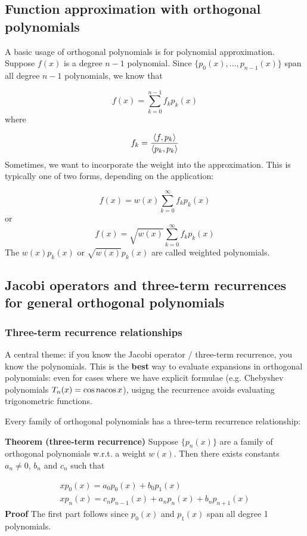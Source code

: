 \documentclass[12pt,landscape]{article}
\def\acos{ {\rm acos}\, }
\def\ip<#1>{\left\langle{#1}\right\rangle}
\begin{document}
{\subsection{Function approximation with orthogonal polynomials}
A basic usage of orthogonal polynomials is for polynomial approximation. Suppose $f(x)$ is a degree $n-1$ polynomial. Since $\{p_0(x),\ldots,p_{n-1}(x)\}$ span all degree $n-1$ polynomials, we know that

\[
f(x) = \sum_{k=0}^{n-1} f_k p_k(x)
\]
where

\[
f_k = {\ip<f, p_k> \over \ip<p_k,p_k>}
\]
Sometimes, we want to incorporate the weight into the approximation. This is typically one of two forms, depending on the application:

\[
f(x) = w(x) \sum_{k=0}^\infty f_k p_k(x)
\]
or
\[
        f(x) = \sqrt{w(x)} \sum_{k=0}^\infty f_k p_k(x)
\]
The $w(x)p_k(x)$ or $\sqrt{w(x)}p_k(x)$ are called weighted polynomials.

\subsection{Jacobi operators and three-term recurrences for general orthogonal polynomials}
\subsubsection{Three-term recurrence relationships}
A central theme: if you know the Jacobi operator / three-term recurrence, you know the polynomials. This is the \textbf{best} way to evaluate expansions in orthogonal polynomials: even for cases where we have explicit formulae (e.g. Chebyshev polynomials $T_n(x) = \cos n \acos x$), usigng the recurrence avoids evaluating trigonometric functions.

Every family of orthogonal polynomials has a three-term recurrence relationship:

\textbf{Theorem (three-term recurrence)} Suppose $\{p_n(x)\}$ are a family of orthogonal polynomials w.r.t. a weight $w(x)$. Then there exists constants $a_n \neq 0$, $b_n$ and $c_n$ such that


\begin{align*}
x p_0(x) = a_0 p_0(x) + b_0 p_1(x) \\
x p_n(x) = c_n p_{n-1}(x) + a_n p_n(x) + b_n p_{n+1}(x)
\end{align*}
\newpage
\textbf{Proof} The first part follows since $p_0(x)$ and $p_1(x)$ span all degree 1 polynomials.

}
\end{document}
